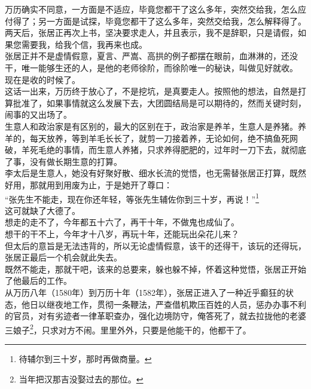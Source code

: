 \begin{multicols}{\theparacolNo}
万历确实不同意，一方面是不适应，毕竟您都干了这么多年，突然交给我，怎么应付得了；另一方面是试探，毕竟您都干了这么多年，突然交给我，怎么解释得了。\\

两天后，张居正再次上书，坚决要求走人，并且表示，我不是辞职，只是请假，如果您需要我，给我个信，我再来也成。\\

张居正并不是虚情假意，夏言、严嵩、高拱的例子都摆在眼前，血淋淋的，还没干，唯一能够生还的人，是他的老师徐阶，而徐阶唯一的秘诀，叫做见好就收。\\

现在是收的时候了。\\

这话一出来，万历终于放心了，不是挖坑，是真要走人。按照他的想法，自然是打算批准了，如果事情就这么发展下去，大团圆结局是可以期待的，然而关键时刻，闹事的又出场了。\\

生意人和政治家是有区别的，最大的区别在于，政治家是养羊，生意人是养猪。养羊的，每天放养，等到羊毛长长了，就剪一刀接着养，无论如何，绝不搞鱼死网破，羊死毛绝的事情，而生意人养猪，只求养得肥肥的，过年时一刀下去，就彻底了事，没有做长期生意的打算。\\

李太后是生意人，她没有好聚好散、细水长流的觉悟，也无需替张居正打算，既然好用，那就用到用废为止，于是她开了尊口：\\

“张先生不能走，现在你还年轻，等张先生辅佐你到三十岁，再说！”\footnote{待辅尔到三十岁，那时再做商量。}\\

这可就缺了大德了。\\

想走的走不了，今年都五十六了，再干十年，不做鬼也成仙了。\\

想干的干不上，今年才十八岁，再玩十年，还能玩出朵花儿来？\\

但太后的意旨是无法违背的，所以无论虚情假意，该干的还得干，该玩的还得玩，张居正最后一个机会就此失去。\\

既然不能走，那就干吧，该来的总要来，躲也躲不掉，怀着这种觉悟，张居正开始了他最后的工作。\\

从万历八年（1580年）到万历十年（1582年），张居正进入了一种近乎癫狂的状态，他日以继夜地工作，贯彻一条鞭法，严查借机欺压百姓的人员，惩办办事不利的官员，对有劣迹者一律革职查办，强化边境防守，俺答死了，就去拉拢他的老婆三娘子\footnote{当年把汉那吉没娶过去的那位。}，只求对方不闹。里里外外，只要是他能干的，他都干了。\\


\end{multicols}
